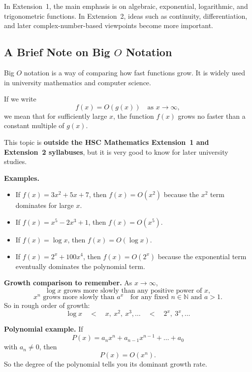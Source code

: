 \documentclass[12pt]{article}
\theoremstyle{definition}
\begin{document}
In Extension~1, the main emphasis is on algebraic, exponential, logarithmic, and trigonometric functions. In Extension~2, ideas such as continuity, differentiation, and later complex-number-based viewpoints become more important.

\subsection{A Brief Note on Big $O$ Notation}
Big $O$ notation is a way of comparing how fast functions grow. It is widely used in university mathematics and computer science.

If we write
\[
f(x)=O(g(x)) \quad \text{as } x\to\infty,
\]
we mean that for sufficiently large $x$, the function $f(x)$ grows no faster than a constant multiple of $g(x)$.

This topic is \textbf{outside the HSC Mathematics Extension~1 and Extension~2 syllabuses}, but it is very good to know for later university studies.

\textbf{Examples.}
\begin{itemize}[leftmargin=*]
  \item If $f(x)=3x^2+5x+7$, then $f(x)=O(x^2)$ because the $x^2$ term dominates for large $x$.
  \item If $f(x)=x^5-2x^3+1$, then $f(x)=O(x^5)$.
  \item If $f(x)=\log x$, then $f(x)=O(\log x)$.
  \item If $f(x)=2^x+100x^4$, then $f(x)=O(2^x)$ because the exponential term eventually dominates the polynomial term.
\end{itemize}

\textbf{Growth comparison to remember.} As $x\to\infty$,
\[
\log x \text{ grows more slowly than any positive power of } x,
\]
\[
x^n \text{ grows more slowly than } a^x \quad \text{for any fixed } n\in\mathbb{N} \text{ and } a>1.
\]
So in rough order of growth:
\[
\log x \quad < \quad x,\ x^2,\ x^3,\dots \quad < \quad 2^x,\ 3^x,\dots
\]

\textbf{Polynomial example.} If
\[
P(x)=a_nx^n+a_{n-1}x^{n-1}+\dots+a_0
\]
with $a_n\ne 0$, then
\[
P(x)=O(x^n).
\]
So the degree of the polynomial tells you its dominant growth rate.
\end{document}
